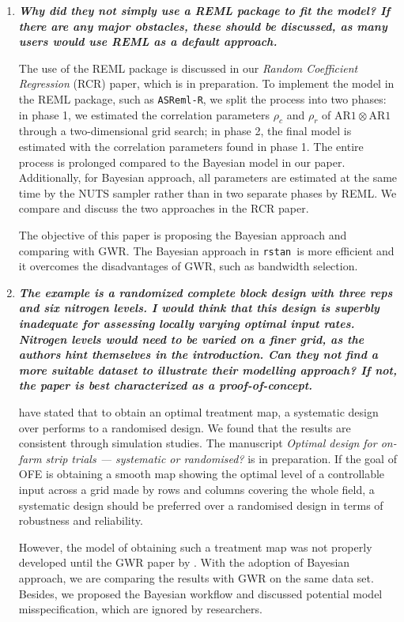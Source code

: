 \documentclass[a4paper]{article}   	%
\newcommand{\asreml}{\texttt{ASReml-R}}
\newcommand{\rstan}{\texttt{rstan}}
\newcommand{\AR}{\mathrm{AR}1}
\newcommand{\qtitle}[1]{\textit{\textbf{#1}}}
\begin{document}
\begin{enumerate}
    \item \qtitle{Why did they not simply use a REML package to fit the model? If there are any major obstacles, these should be discussed, as many users would use REML as a default approach.}
    
    The use of the REML package is discussed in our \textit{Random Coefficient Regression} (RCR) paper, which is in preparation. To implement the model in the REML package, such as \asreml, we split the process into two phases: in phase 1, we estimated the correlation parameters $\rho_c$ and $\rho_r$ of $\AR\otimes\AR$ through a two-dimensional grid search; in phase 2, the final model is estimated with the correlation parameters found in phase 1. The entire process is prolonged compared to the Bayesian model in our paper. Additionally, for Bayesian approach, all parameters are estimated at the same time by the NUTS sampler rather than in two separate phases by REML. We compare and discuss the two approaches in the RCR paper. 
    
    The objective of this paper is proposing the Bayesian approach and comparing with GWR. The Bayesian approach in \rstan\ is more efficient and it overcomes the disadvantages of GWR, such as bandwidth selection. 
    
    \item \qtitle{The example is a randomized complete block design with three reps and six nitrogen levels. I would think that this design is superbly inadequate for assessing locally varying optimal input rates. Nitrogen levels would need to be varied on a finer grid, as the authors hint themselves in the introduction. Can they not find a more suitable dataset to illustrate their modelling approach? If not, the paper is best characterized as a proof-of-concept.}
    
	\textcite{Piepho2011Statistical, Pringle2004FieldScale} have stated that to obtain an optimal treatment map, a systematic design over performs to a randomised design. We found that the results are consistent through simulation studies. The manuscript \textit{Optimal design for on-farm strip trials --- systematic or randomised?} is in preparation. If the goal of OFE is obtaining a smooth map showing the optimal level of a controllable input across a grid made by rows and columns covering the whole field, a systematic design should be preferred over a randomised design in terms of robustness and reliability. 
	
	However, the model of obtaining such a treatment map was not properly developed until the GWR paper by \textcite{Rakshit2020Novel}. With the adoption of Bayesian approach, we are comparing the results with GWR on the same data set. Besides, we proposed the Bayesian workflow and discussed potential model misspecification, which are ignored by researchers. 


\end{enumerate}
\end{document}
